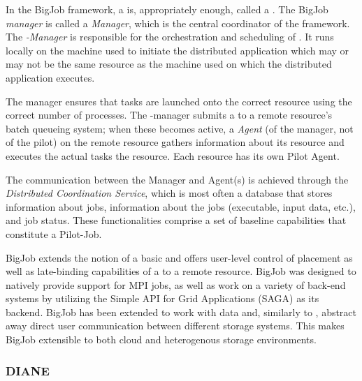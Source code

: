\documentclass{sig-alternate}
\begin{document}
In the BigJob framework, a \pilot is, appropriately enough, called a
\pilot. The BigJob \textit{manager} is called a \textit{\pilot
  Manager}, which is the central coordinator of the
framework.  The \textit{\pilot-Manager} is responsible for
the orchestration and scheduling of \pilots. It runs locally on the
machine used to initiate the distributed application which may or may
not be the same resource as the machine used on which the distributed
application executes.

The manager ensures that tasks are launched onto the correct resource
using the correct number of processes. The \pilot-manager submits a
\pilot to a remote resource's batch queueing system; when these
\pilots becomes active, a \textit{Agent} (of the manager, not of the
pilot) on the remote resource gathers information about its resource
and executes the actual tasks the resource.   Each resource has its own Pilot Agent. 

The communication between the Manager and Agent(s) is achieved through
the {\it Distributed Coordination Service}, which is most often a
database that stores information about jobs, information about the
jobs (executable, input data, etc.), and job status. These
functionalities comprise a set of baseline capabilities that
constitute a Pilot-Job.

BigJob extends the notion of a basic \pilotjob and offers user-level
control of \pilot placement as well as late-binding capabilities of a
\pilot to a remote resource. BigJob was designed to natively provide
support for MPI jobs, as well as work on a variety of back-end systems
by utilizing the Simple API for Grid Applications (SAGA) as its
backend. BigJob has been extended to work with data and, similarly to
\pilotjobs, abstract away direct user communication between different
storage systems. This makes BigJob extensible to both cloud and
heterogenous storage environments.

\subsubsection{DIANE}
\end{document}
